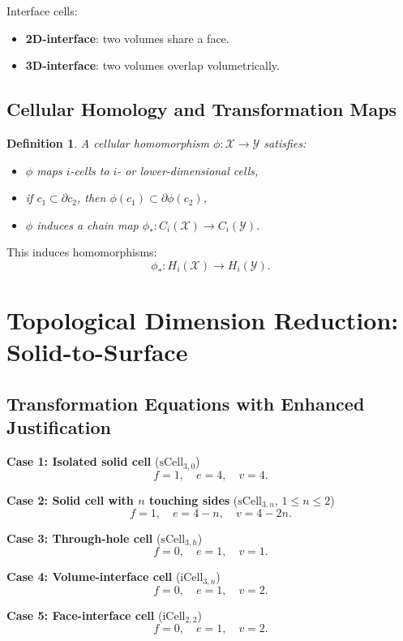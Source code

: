 \documentclass[conference]{IEEEtran}
\newtheorem{definition}{Definition}
\begin{document}
Interface cells:
\begin{itemize}
    \item \textbf{2D-interface}: two volumes share a face.
    \item \textbf{3D-interface}: two volumes overlap volumetrically.
\end{itemize}

\subsection{Cellular Homology and Transformation Maps}

\begin{definition}
A \emph{cellular homomorphism} $\phi:\mathcal{X}\to\mathcal{Y}$ satisfies:
\begin{itemize}
    \item $\phi$ maps $i$-cells to $i$- or lower-dimensional cells,
    \item if $c_1 \subset \partial c_2$, then $\phi(c_1) \subset \partial\phi(c_2)$,
    \item $\phi$ induces a chain map $\phi_* : C_i(\mathcal{X}) \to C_i(\mathcal{Y})$.
\end{itemize}
\end{definition}

This induces homomorphisms:
\[
\phi_* : H_i(\mathcal{X}) \to H_i(\mathcal{Y}).
\]

\section{Topological Dimension Reduction: Solid-to-Surface}

\subsection{Transformation Equations with Enhanced Justification}

\textbf{Case 1: Isolated solid cell} ($\mathrm{sCell}_{3,0}$)
\[
f = 1,\quad e = 4,\quad v = 4.
\]

\textbf{Case 2: Solid cell with $n$ touching sides} ($\mathrm{sCell}_{3,n}$, $1 \le n \le 2$)
\[
f = 1,\quad e = 4 - n,\quad v = 4 - 2n.
\]

\textbf{Case 3: Through-hole cell} ($\mathrm{sCell}_{3,h}$)
\[
f = 0,\quad e = 1,\quad v = 1.
\]

\textbf{Case 4: Volume-interface cell} ($\mathrm{iCell}_{3,n}$)
\[
f = 0,\quad e = 1,\quad v = 2.
\]

\textbf{Case 5: Face-interface cell} ($\mathrm{iCell}_{2,2}$)
\[
f = 0,\quad e = 1,\quad v = 2.
\]
\end{document}
